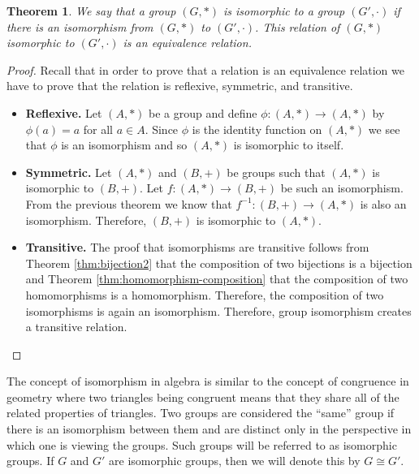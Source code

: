 \documentclass[
]{book}
\newtheorem{theorem}{Theorem}[chapter]
\theoremstyle{definition}
\theoremstyle{definition}
\theoremstyle{definition}
\theoremstyle{definition}
\theoremstyle{remark}
\begin{document}
\begin{theorem}
\protect\hypertarget{thm:group-isomorphism-equivalence}{}\label{thm:group-isomorphism-equivalence}We say that a group \((G,*)\) is isomorphic to a group \((G',\cdot)\) if there is an isomorphism from \((G,*)\) to \((G',\cdot)\). This relation of \((G,*)\) isomorphic to \((G',\cdot)\) is an equivalence relation.
\end{theorem}

\begin{proof}

Recall that in order to prove that a relation is an equivalence relation we have to prove that the relation is reflexive, symmetric, and transitive.

\begin{itemize}
\item
  \textbf{Reflexive.} Let \((A,*)\) be a group and define \(\phi:(A,*)\rightarrow (A,*)\) by \(\phi(a)=a\) for all \(a\in A\). Since \(\phi\) is the identity function on \((A,*)\) we see that \(\phi\) is an isomorphism and so \((A,*)\) is isomorphic to itself.
\item
  \textbf{Symmetric.} Let \((A,*)\) and \((B,+)\) be groups such that \((A,*)\) is isomorphic to \((B,+)\). Let \(f:(A,*)\rightarrow (B,+)\) be such an isomorphism. From the previous theorem we know that \(f^{-1}: (B,+) \rightarrow (A,*)\) is also an isomorphism. Therefore, \((B,+)\) is isomorphic to \((A,*)\).
\item
  \textbf{Transitive.} The proof that isomorphisms are transitive follows from Theorem \ref{thm:bijection2} that the composition of two bijections is a bijection and Theorem \ref{thm:homomorphism-composition} that the composition of two homomorphisms is a homomorphism. Therefore, the composition of two isomorphisms is again an isomorphism. Therefore, group isomorphism creates a transitive relation.
\end{itemize}

\end{proof}

The concept of isomorphism in algebra is similar to the concept of congruence in geometry where two triangles being congruent means that they share all of the related properties of triangles. Two groups are considered the ``same'' group if there is an isomorphism between them and are distinct only in the perspective in which one is viewing the groups. Such groups will be referred to as isomorphic groups. If \(G\) and \(G'\) are isomorphic groups, then we will denote this by \(G \cong G'\).
\end{document}
